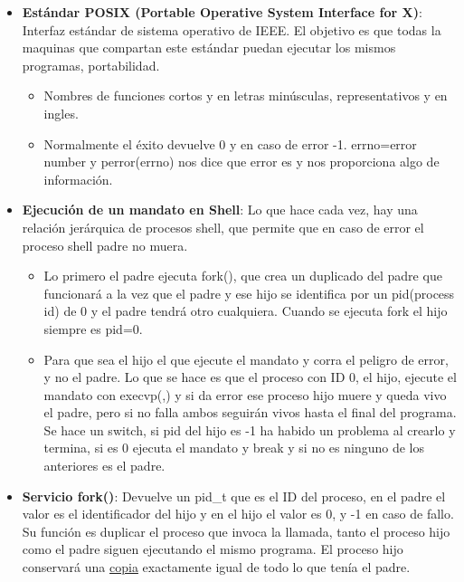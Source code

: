 \documentclass[12pt, twoside, openright]{report} %
\begin{document}
\begin{itemize}
\item \textbf{Estándar POSIX (Portable Operative System Interface for X)}:
  Interfaz estándar de sistema operativo de IEEE. El objetivo es que
  todas la maquinas que compartan este estándar puedan ejecutar los
  mismos programas, portabilidad.
  

  \begin{itemize}
  \item Nombres de funciones cortos y en letras minúsculas, representativos
    y en ingles.
    
  \item Normalmente el éxito devuelve 0 y en caso de error -1. errno=error
    number y perror(errno) nos dice que error es y nos proporciona algo
    de información.
    
  \end{itemize}
\item \textbf{Ejecución de un mandato en Shell}: Lo que hace cada vez, hay
  una relación jerárquica de procesos shell, que permite que en caso de
  error el proceso shell padre no muera.
  

  \begin{itemize}
  \item Lo primero el padre ejecuta fork(), que crea un duplicado del padre
    que funcionará a la vez que el padre y ese hijo se identifica por un
    pid(process id) de 0 y el padre tendrá otro cualquiera. Cuando se
    ejecuta fork el hijo siempre es pid=0.
    
  \item Para que sea el hijo el que ejecute el mandato y corra el peligro de
    error, y no el padre. Lo que se hace es que el proceso con ID 0, el
    hijo, ejecute el mandato con execvp(,) y si da error ese proceso
    hijo muere y queda vivo el padre, pero si no falla ambos seguirán
    vivos hasta el final del programa. Se hace un switch, si pid del
    hijo es -1 ha habido un problema al crearlo y termina, si es 0
    ejecuta el mandato y break y si no es ninguno de los anteriores es
    el padre.
    
  \end{itemize}
\item \textbf{Servicio fork()}: Devuelve un pid\_t que es el ID del proceso,
  en el padre el valor es el identificador del hijo y en el hijo el
  valor es 0, y -1 en caso de fallo. Su función es duplicar el proceso
  que invoca la llamada, tanto el proceso hijo como el padre siguen
  ejecutando el mismo programa. El proceso hijo conservará una
  \underline{copia} exactamente igual de todo lo que tenía el padre.
  

\end{itemize}
\end{document}

